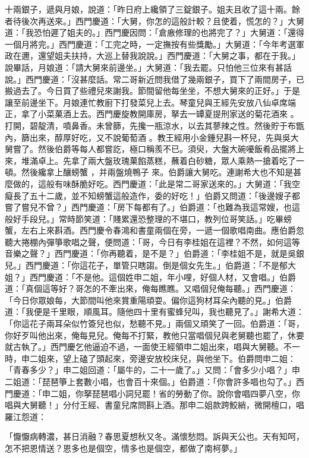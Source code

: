 十兩銀子，遞與月娘，說道：「昨日府上纔領了三錠銀子。姐夫且收了這十兩。餘者待後次再送來。」西門慶道：「大舅，你怎的這般計較？且使着，慌怎的？」大舅道：「我恐怕遲了姐夫的。」西門慶因問：「倉廒修理的也將完了？」大舅道：「還得一個月將完。」西門慶道：「工完之時，一定撫按有些獎勵。」大舅道：「今年考選軍政在邇，還望姐夫扶持，大巡上替我說說。」西門慶道：「大舅之事，都在于我。」說畢話，月娘道：「請大舅來前邊坐。」大舅道：「我去罷。只怕他三位來有甚話說。」西門慶道：「沒甚麼話。常二哥新近問我借了幾兩銀子，買下了兩間房子，已搬過去了。今日買了些禮兒來謝我。節間留他每坐坐，不想大舅來的正好。」于是讓至前邊坐下。月娘連忙教廚下打發菜兒上去。琴童兒與王經先安放八仙卓席端正，拿了小菜菓酒上去。西門慶旋教開庫房，拏去一罈夏提刑家送的菊花酒來 。打開，碧靛清，噴鼻香。未曾篩，先攙一瓶涼水，以去其蓼辣之性。然後貯于布甑內，篩出來，醇厚好吃，又不說葡萄酒 。教王經用小金鍾兒斟一杯兒，先與吳大舅嘗了。然後伯爵等每人都嘗訖，極口稱羨不已。須臾，大盤大碗嚘飯肴品擺將上來，堆滿卓上。先拿了兩大盤玫瑰菓餡蒸糕，蘸着白砂糖，眾人乘熱一搶着吃了一頓。然後纔拿上釀螃蟹 ，并兩盤燒鴨子 來。伯爵讓大舅吃。連謝希大也不知是甚麼做的，這般有味酥脆好吃。西門慶道：「此是常二哥家送來的。」大舅道：「我空癡長了五十二歲，並不知螃蟹這般造作，委的好吃！」伯爵又問道：「後邊嫂子都嘗了嘗兒不曾？」西門慶道：「房下每都有了。」伯爵道：「也難為我這常嫂，也這般好手段兒。」常時節笑道：「賤累還恐整理的不堪口，教列位哥笑話。」吃畢螃蟹，左右上來斟酒。西門慶令春鴻和書童兩個在旁，一遞一個歌唱南曲。應伯爵忽聽大捲棚內彈箏歌唱之聲，便問道：「哥，今日有李桂姐在這裡？不然，如何這等音樂之聲？」西門慶道：「你再聽着，是不是？」伯爵道：「李桂姐不是，就是吳銀兒。」西門慶道：「你這花子，單管只瞎謅。倒是個女先生。」伯爵道：「不是郁大姐？」西門慶道：「不是他。這個姓申二姐，年小哩，好個人材，又會唱。」伯爵道：「真個這等好？哥怎的不牽出來，俺每瞧瞧。又唱個兒俺每聽。」西門慶道：「今日你眾娘每，大節間叫他來賞重陽頑耍。偏你這狗材耳朵內聽的見。」伯爵道：「我便是千里眼，順風耳。隨他四十里有蜜蜂兒叫，我也聽見了。」謝希大道：「你這花子兩耳朵似竹簽兒也似，愁聽不見。」兩個又頑笑了一回。伯爵道：「哥，你好歹叫他出來，俺每見兒。俺每不打緊，教他只當唱個兒與老舅聽也罷了，休要就古執了。」西門慶乞他逼迫不過，一面使王經領申二姐出來，唱與大舅聽。不一時，申二姐來，望上磕了頭起來，旁邊安放校床兒，與他坐下。伯爵問申二姐：「青春多少？」申二姐回道：「屬牛的，二十一歲了。」又問：「會多少小唱？」申二姐道：「琵琶箏上套數小唱，也會百十來個。」伯爵道：「你會許多唱也勾了。」西門慶道：「申二姐，你拏琵琶唱小詞兒罷！省的勞動了你。說你會唱四夢八空，你唱與大舅聽！」分付王經、書童兒席問斟上酒。那申二姐款跨鮫綃，微開檀口，唱羅江怨道：

「懨懨病轉濃，甚日消融？春思夏想秋又冬。滿懷愁悶。訴與天公也。天有知呵，怎不把恩情送？恩多也是個空，情多也是個空，都做了南柯夢。」


